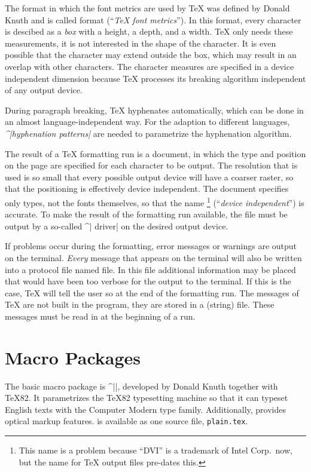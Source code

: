 The format in which the font metrics are used by \TeX{} was
defined by {\sc Donald Knuth} and is called   format
(``{\sl \TeX{} font metrics\/}''). In this format, every character is
descibed as a {\it box\/} with a height, a depth, and a width.
\TeX{} only needs these measurements, it is not interested in the shape
of the character. It is even possible that the character may extend
outside 
the box, which may result in an overlap with other characters.
The character measures are specified in a device independent
dimension because \TeX{} processes its breaking algorithm
independent of any output device.

During paragraph breaking, \TeX{} hyphenates automatically, which
can be done in an almost language-independent way. For the adaption to
different languages, {\it ^|hyphenation patterns|\/} are needed to
parametrize the hyphenation algorithm.

The result of a \TeX{} formatting run is a  document, in which
the type and position on the page are specified for each character to
be output. The resolution that is used is so small that
every possible output device will have a coarser raster, so that the
positioning is effectively device independent. The \DVI{} document
specifies only types, not the fonts themselves, so that the name \DVI{}%
   \footnote{
      This name is a problem because ``DVI'' is a trademark of 
      Intel Corp.\ now, but the name \DVI{} for \TeX{} output files 
      pre-dates this.
      }
 (``{\sl device independent\/}'') is accurate. To make the result of
the formatting run available, the \DVI{} file must be output by a
so-called ^|\DVI{} driver| on the desired output device.

If problems occur during the formatting, error messages or warnings
are output on the terminal. {\it Every\/} message that appears on the
terminal will also be written into a protocol file named 
file. In this \LOG{} file additional information may be placed that
would have been too verbose for the output to the terminal. If this
is the case, \TeX{} will tell the user so at the end of the
formatting run. The messages of \TeX{} are not built in the program,
they are stored in a (string)  file. These messages must
be read in at the beginning of a run.



\section{Macro Packages}
The basic macro package is ^|\Plain|, developed by {\sc Donald Knuth}
together with \TeX82. It parametrizes the \TeX82 typesetting machine
so that it can typeset English texts with the Computer Modern type
family. Additionally, \Plain{} provides optical markup features.
\Plain{} is available as one source file, {\tt plain.tex}.

